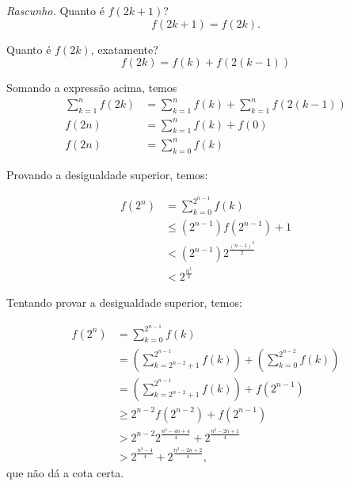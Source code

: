 \documentclass[10pt, a4paper]{article}
\begin{document}

	\setcounter{prob}{1}


	\noindent \textit{Rascunho.} Quanto é $f(2k+1)$?
	\[ f(2k+1) = f(2k).\]

	Quanto é $f(2k)$, exatamente?
	\[f(2k) = f(k) + f(2(k-1))\]
	
	Somando a expressão acima, temos
	\begin{align*}
		\sum_{k=1}^{n} f(2k) & = \sum_{k=1}^{n} f(k) + \sum_{k=1}^{n} f(2(k-1))\\
		f(2n) & = \sum_{k=1}^{n} f(k) + f(0)\\
		f(2n) & = \sum_{k=0}^{n} f(k)
	\end{align*}

	Provando a desigualdade superior, temos:

	\begin{align*}
		f(2^n) & = \sum_{k=0}^{2^{n-1}} f(k) \\
			   & \le (2^{n-1})f(2^{n-1}) + 1\\
			   & < (2^{n-1})2^{\frac{(n-1)^2}{2}}\\
			   & < 2^\frac{n^2}{2}
	\end{align*}

	Tentando provar a desigualdade superior, temos:

	\begin{align*}
		f(2^n) & = \sum_{k=0}^{2^{n-1}} f(k) \\
			   & = \left(\sum_{k=2^{n-2}+1}^{2^{n-1}} f(k)\right) + \left(\sum_{k=0}^{2^{n-2}} f(k)\right) \\
			   & = \left(\sum_{k=2^{n-2}+1}^{2^{n-1}} f(k)\right) + f(2^{n-1}) \\
			   & \ge 2^{n-2}f(2^{n-2}) + f(2^{n-1})\\
			   & > 2^{n-2}2^\frac{n^2-4n+4}{4} + 2^\frac{n^2-2n+1}{4}\\
			   & > 2^\frac{n^2 - 4}{4} + 2^\frac{n^2 - 2n + 2}{4},
	\end{align*}
	que não dá a cota certa.
\end{document}

